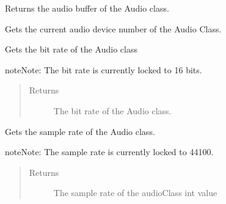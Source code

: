 \documentclass[letterpaper,10pt,english,openany,oneside]{sphinxmanual}
\begin{document}
\begin{fulllineitems}
\begin{fulllineitems}

\pysigstartsignatures
{}
\pysigstopsignatures
\sphinxAtStartPar
Returns the audio buffer of the Audio class.

\end{fulllineitems}



\begin{fulllineitems}

\pysigstartsignatures
{}
\pysigstopsignatures
\sphinxAtStartPar
Gets the current audio device number of the Audio Class.

\end{fulllineitems}



\begin{fulllineitems}

\pysigstartsignatures
{}
\pysigstopsignatures
\sphinxAtStartPar
Gets the bit rate of the Audio class

\begin{sphinxadmonition}{note}{Note:}
\sphinxAtStartPar
The bit rate is currently locked to 16 bits.
\end{sphinxadmonition}
\begin{quote}\begin{description}
\item[{Returns}] \leavevmode
\sphinxAtStartPar
The bit rate of the Audio class.

\end{description}\end{quote}

\end{fulllineitems}



\begin{fulllineitems}

\pysigstartsignatures
{}
\pysigstopsignatures
\sphinxAtStartPar
Gets the sample rate of the Audio class.

\begin{sphinxadmonition}{note}{Note:}
\sphinxAtStartPar
The sample rate is currently locked to 44100.
\end{sphinxadmonition}
\begin{quote}\begin{description}
\item[{Returns}] \leavevmode
\sphinxAtStartPar
The sample rate of the audioClass \sphinxhyphen{} int value


\end{description}
\end{quote}
\end{fulllineitems}
\end{fulllineitems}
\end{document}
